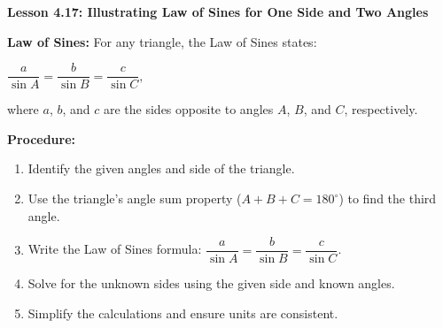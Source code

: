 \begin{center}
\textbf{Lesson 4.17: Illustrating Law of Sines for One Side and Two Angles}
\end{center}

\vspace*{-1.5ex}

\noindent\textbf{Law of Sines:}  
For any triangle, the Law of Sines states:  

{\centering $
\dfrac{a}{\sin A} = \dfrac{b}{\sin B} = \dfrac{c}{\sin C},
$\par}
\noindent where \(a\), \(b\), and \(c\) are the sides opposite to angles \(A\), \(B\), and \(C\), respectively.

\noindent\textbf{Procedure:}  
\begin{enumerate}
    \item Identify the given angles and side of the triangle.  
    \item Use the triangle's angle sum property (\(A + B + C = 180^\circ\)) to find the third angle.  
    \item Write the Law of Sines formula: \(\dfrac{a}{\sin A} = \dfrac{b}{\sin B} = \dfrac{c}{\sin C}\).  
    \item Solve for the unknown sides using the given side and known angles.  
    \item Simplify the calculations and ensure units are consistent.
\end{enumerate}
